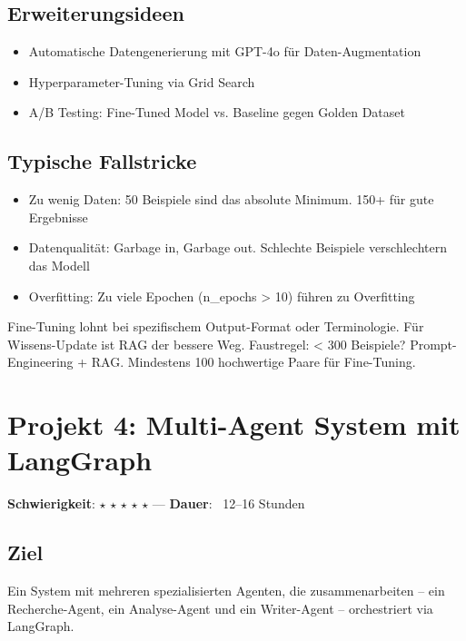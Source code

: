 \subsection*{Erweiterungsideen}
\begin{itemize}[leftmargin=*]
    \item Automatische Datengenerierung mit GPT-4o für Daten-Augmentation
    \item Hyperparameter-Tuning via Grid Search
    \item A/B Testing: Fine-Tuned Model vs. Baseline gegen Golden Dataset
\end{itemize}

\subsection*{Typische Fallstricke}
\begin{itemize}[leftmargin=*]
    \item Zu wenig Daten: 50 Beispiele sind das absolute Minimum. 150+ für gute Ergebnisse
    \item Datenqualität: Garbage in, Garbage out. Schlechte Beispiele verschlechtern das Modell
    \item Overfitting: Zu viele Epochen (n\_epochs > 10) führen zu Overfitting
\end{itemize}

\begin{praxishinweis}
Fine-Tuning lohnt bei spezifischem Output-Format oder Terminologie. Für Wissens-Update ist RAG der bessere Weg. Faustregel: < 300 Beispiele? Prompt-Engineering + RAG. Mindestens 100 hochwertige Paare für Fine-Tuning.
\end{praxishinweis}

\section{Projekt 4: Multi-Agent System mit LangGraph}

\textbf{Schwierigkeit}: $\star$ $\star$ $\star$ $\star$ $\star$ ---
\textbf{Dauer}: ~12--16 Stunden

\subsection*{Ziel}
Ein System mit mehreren spezialisierten Agenten, die zusammenarbeiten -- ein Recherche-Agent, ein Analyse-Agent und ein Writer-Agent -- orchestriert via LangGraph.

